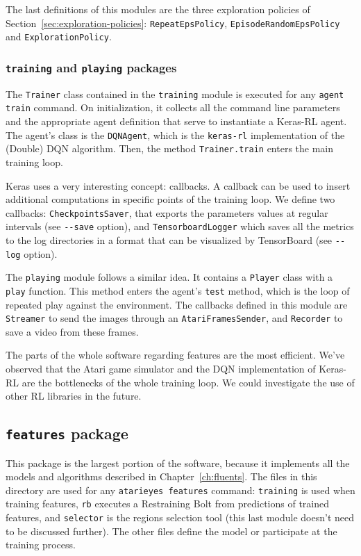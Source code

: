 The last definitions of this modules are the three exploration policies of
Section~\ref{sec:exploration-policies}: \texttt{RepeatEpsPolicy},
\texttt{EpisodeRandomEpsPolicy} and \texttt{ExplorationPolicy}.


\subsubsection*{\texttt{training} and \texttt{playing} packages}

The \texttt{Trainer} class contained in the \texttt{training} module is
executed for any \verb|agent train| command. On
initialization, it collects all the command line parameters and the
appropriate agent definition that serve to instantiate a Keras-RL agent. The
agent's class is the \texttt{DQNAgent}, which is the \texttt{keras-rl}
implementation of the (Double) DQN algorithm. Then, the method
\verb|Trainer.train| enters the main training loop.

Keras uses a very interesting concept: callbacks. A callback can be used to
insert additional computations in specific points of the training loop.  We
define two callbacks: \texttt{CheckpointsSaver}, that exports the parameters
values at regular intervals (see \verb|--save| option), and
\texttt{TensorboardLogger} which saves all the metrics to the log directories
in a format that can be visualized by TensorBoard (see \verb|--log| option).

The \texttt{playing} module follows a similar idea. It contains a
\texttt{Player} class with a \texttt{play} function. This method enters the
agent's \texttt{test} method, which is the loop of repeated play against the
environment. The callbacks defined in this module are \texttt{Streamer} to
send the images through an \texttt{AtariFramesSender}, and \texttt{Recorder}
to save a video from these frames.

The parts of the whole software regarding features are the most efficient.
We've observed that the Atari game simulator and the DQN implementation of
Keras-RL are the bottlenecks of the whole training loop. We could investigate
the use of other RL libraries in the future.


\subsection{\texttt{features} package}

This package is the largest portion of the software, because it implements all
the models and algorithms described in Chapter~\ref{ch:fluents}. The files in
this directory are used for any \verb|atarieyes features| command:
\texttt{training} is used when training features, \texttt{rb} executes a
Restraining Bolt from predictions of trained features, and \texttt{selector}
is the regions selection tool (this last module doesn't need to be discussed
further).  The other files define the model or participate at the training
process.


